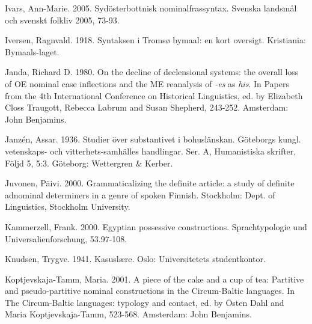 Ivars, Ann-Marie. 2005. Sydösterbottnisk nominalfrassyntax. Svenska landsmål och svenskt folkliv 2005, 73-93.


Iversen, Ragnvald. 1918. Syntaksen i Tromsø bymaal: en kort oversigt. Kristiania: Bymaals-laget.


Janda, Richard D. 1980. On the decline of declensional systems: the overall loss of OE nominal case inflections and the ME reanalysis of \textit{{}-es} as \textit{his}. In Papers from the 4th International Conference on Historical Linguistics, ed. by Elizabeth Closs Traugott, Rebecca Labrum and Susan Shepherd, 243-252. Amsterdam: John Benjamins.


Janzén, Assar. 1936. Studier över substantivet i bohuslänskan. Göteborgs kungl. vetenskaps- och vitterhets-samhälles handlingar. Ser. A, Humanistiska skrifter, Följd 5, 5:3. Göteborg: Wettergren \& Kerber.


Juvonen, Päivi. 2000. Grammaticalizing the definite article: a study of definite adnominal determiners in a genre of spoken Finnish. Stockholm: Dept. of Linguistics, Stockholm University.


Kammerzell, Frank. 2000. Egyptian possessive constructions. Sprachtypologie und Universalienforschung, 53.97-108.


Knudsen, Trygve. 1941. Kasuslære. Oslo: Universitetets studentkontor.


Koptjevskaja-Tamm, Maria. 2001. {\textquotedbl}A piece of the cake{\textquotedbl} and {\textquotedbl}a cup of tea{\textquotedbl}: Partitive and pseudo-partitive nominal constructions in the Circum-Baltic languages. In The Circum-Baltic languages: typology and contact, ed. by Östen Dahl and Maria Koptjevskaja-Tamm, 523-568. Amsterdam: John Benjamins.


